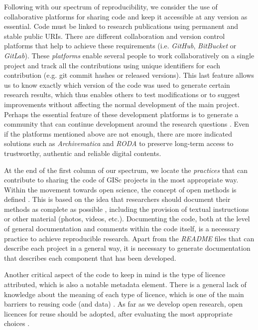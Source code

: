 \documentclass[ijgi,article,submit,moreauthors,pdftex]{Definitions/mdpi}
\begin{document}
Following with our spectrum of reproducibility, we consider the use of collaborative platforms for sharing code and keep it accessible at any version as essential. Code must be linked to research publications using permanent and stable public URIs. There are different collaboration and version control platforms that help to achieve these requirements (i.e. \textit{GitHub}, \textit{BitBucket} or \textit{GitLab}). These \textit{platforms} enable several people to work collaboratively on a single project and track all the contributions using unique identifiers for each contribution (e.g. git commit hashes or released versions). This last feature allows us to know exactly which version of the code was used to generate certain research results, which thus enables others to test modifications or to suggest improvements without affecting the normal development of the main project. Perhaps the essential feature of these development platforms is to generate a community that can continue development around the research questions \cite{ram2013git}. Even if the platforms mentioned above are not enough, there are more indicated solutions such as \textit{Archivematica} \cite{van2010archivematica} and \textit{RODA} \cite{faria2009roda} to preserve long-term access to trustworthy, authentic and reliable digital contents.

At the end of the first column of our spectrum, we locate the \textit{practices} that can contribute to sharing the code of GISc projects in the most appropriate way. Within the movement towards open science, the concept of open methods is defined \cite{whyte2011open}. This is based on the idea that researchers should document their methods as complete as possible \cite{nust2018reproducible}, including the provision of textual instructions or other material (photos, videos, etc.). Documenting the code, both at the level of general documentation and comments within the code itself, is a necessary practice to achieve reproducible research. Apart from the \textit{README} files that can describe each project in a general way, it is necessary to generate documentation that describes each component that has been developed.

Another critical aspect of the code to keep in mind is the type of licence attributed, which is also a notable metadata element. There is a general lack of knowledge about the meaning of each type of licence, which is one of the main barriers to reusing code (and data) \cite{benitez2018creating}. As far as we develop open research, open licences for reuse should be adopted, after evaluating the most appropriate choices \cite{stodden2008legal}.
\end{document}
